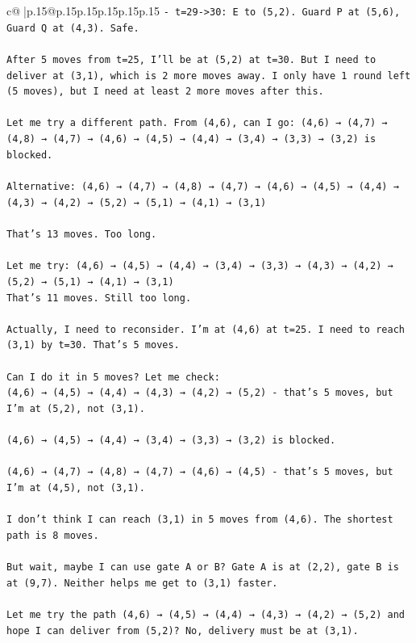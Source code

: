 \documentclass{article}
\begin{document}
{\begin{supertabular}{c@{$\;$}|p{.15\linewidth}@{}p{.15\linewidth}p{.15\linewidth}p{.15\linewidth}p{.15\linewidth}p{.15\linewidth}}
{{{\texttt{{-} t=29{-}>30: E to (5,2). Guard P at (5,6), Guard Q at (4,3). Safe.} \\
\\ 
\texttt{After 5 moves from t=25, I'll be at (5,2) at t=30. But I need to deliver at (3,1), which is 2 more moves away. I only have 1 round left (5 moves), but I need at least 2 more moves after this.} \\
\\ 
\texttt{Let me try a different path. From (4,6), can I go: (4,6) → (4,7) → (4,8) → (4,7) → (4,6) → (4,5) → (4,4) → (3,4) → (3,3) → (3,2) is blocked.} \\
\\ 
\texttt{Alternative: (4,6) → (4,7) → (4,8) → (4,7) → (4,6) → (4,5) → (4,4) → (4,3) → (4,2) → (5,2) → (5,1) → (4,1) → (3,1)} \\
\\ 
\texttt{That's 13 moves. Too long.} \\
\\ 
\texttt{Let me try: (4,6) → (4,5) → (4,4) → (3,4) → (3,3) → (4,3) → (4,2) → (5,2) → (5,1) → (4,1) → (3,1)} \\
\texttt{That's 11 moves. Still too long.} \\
\\ 
\texttt{Actually, I need to reconsider. I'm at (4,6) at t=25. I need to reach (3,1) by t=30. That's 5 moves.} \\
\\ 
\texttt{Can I do it in 5 moves? Let me check:} \\
\texttt{(4,6) → (4,5) → (4,4) → (4,3) → (4,2) → (5,2) {-} that's 5 moves, but I'm at (5,2), not (3,1).} \\
\\ 
\texttt{(4,6) → (4,5) → (4,4) → (3,4) → (3,3) → (3,2) is blocked.} \\
\\ 
\texttt{(4,6) → (4,7) → (4,8) → (4,7) → (4,6) → (4,5) {-} that's 5 moves, but I'm at (4,5), not (3,1).} \\
\\ 
\texttt{I don't think I can reach (3,1) in 5 moves from (4,6). The shortest path is 8 moves.} \\
\\ 
\texttt{But wait, maybe I can use gate A or B? Gate A is at (2,2), gate B is at (9,7). Neither helps me get to (3,1) faster.} \\
\\ 
\texttt{Let me try the path (4,6) → (4,5) → (4,4) → (4,3) → (4,2) → (5,2) and hope I can deliver from (5,2)? No, delivery must be at (3,1).} \\
}}}
\end{supertabular}}
\end{document}
